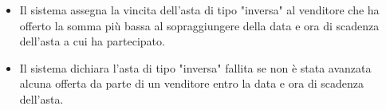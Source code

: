 \begin{itemize}
\begin{itemize}
                    \item Il sistema assegna la vincita dell'asta di tipo "inversa" al venditore che ha offerto la somma più bassa al sopraggiungere della data e ora di scadenza dell'asta a cui ha partecipato.
                    \item Il sistema dichiara l'asta di tipo "inversa" fallita se non è stata avanzata alcuna offerta da parte di un venditore entro la data e ora di scadenza dell'asta.
                \end{itemize}
        \end{itemize}